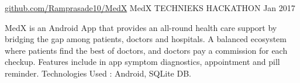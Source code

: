 \begin{cventries}
  \cventry
    {\href{https://github.com/Ramprasade10/MedX}{github.com/Ramprasade10/MedX}} %
    {MedX} %
    {TECHNIEKS HACKATHON} %
    {Jan 2017} %
    {
      \begin{cvitems} %
        \item {MedX is an Android App that provides an all-round health care support by bridging the gap among patients, doctors and hospitals. A balanced ecosystem where patients find the best of doctors, and doctors pay a commission for each checkup. Features include in app symptom diagnostics, appointment and pill reminder.\newline{}
Technologies Used : Android, SQLite DB.}
      \end{cvitems}
    }

\end{cventries}
